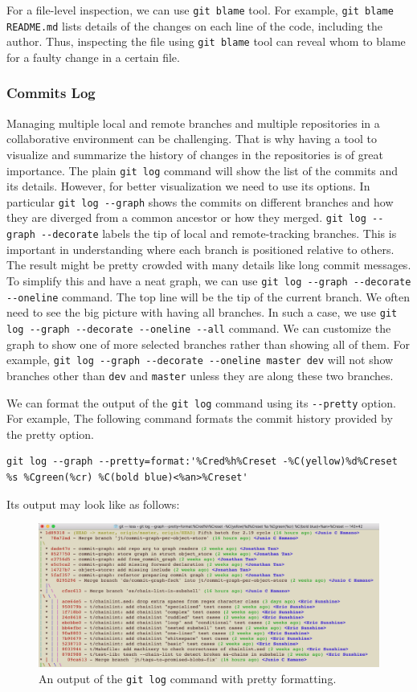 \documentclass[11pt]{article}
\begin{document}
For a file-level inspection, we can use \texttt{git blame} tool. For example, \texttt{git blame README.md} lists details of the changes on each line of the code, including the author. Thus, inspecting the file using \texttt{git blame} tool can reveal whom to blame for a faulty change in a certain file.

\subsubsection{Commits Log}
\label{sec:orgheadline15}
Managing multiple local and remote branches and multiple repositories in a collaborative environment can be challenging. That is why having a tool to visualize and summarize the history of changes in the repositories is of great importance. The plain \texttt{git log} command will show the list of the commits and its details. However, for better visualization we need to use its options. In particular \texttt{git log -{}-graph} shows the commits on different branches and how they are diverged from a common ancestor or how they merged. \texttt{git log -{}-graph -{}-decorate} labels the tip of local and remote-tracking branches. This is important in understanding where each branch is positioned relative to others. The result might be pretty crowded with many details like long commit messages. To simplify this and have a neat graph, we can use \texttt{git log -{}-graph -{}-decorate -{}-oneline} command. The top line will be the tip of the current branch. We often need to see the big picture with having all branches. In such a
case, we use \texttt{git log -{}-graph -{}-decorate -{}-oneline -{}-all} command. We can customize the graph to show one of more selected branches rather than showing all of them. For example, \texttt{git log -{}-graph -{}-decorate -{}-oneline master dev} will not show branches other than \texttt{dev} and \texttt{master} unless they are along these two branches.

We can format the output of the \texttt{git log} command using its \texttt{-{}-pretty} option. For example, The following command formats the commit history provided by the pretty option.
\begin{verbatim}
git log --graph --pretty=format:'%Cred%h%Creset -%C(yellow)%d%Creset %s %Cgreen(%cr) %C(bold blue)<%an>%Creset'
\end{verbatim}
Its output may look like as follows:

\begin{figure}[htb]
\centering
\includegraphics[width=.9\linewidth]{./images/git-log-pretty-1.png}
\caption{\label{fig:orgparagraph6}
An output of the \texttt{git log} command with pretty formatting.}
\end{figure}
\end{document}
